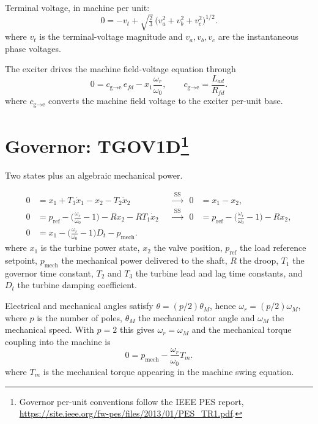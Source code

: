\documentclass[11pt]{article}
\newcommand{\wnom}{\omega_0}
\newcommand{\wrot}{\omega_r}
\begin{document}
Terminal voltage, in machine per unit:
\begin{equation}
  0 = -v_t + \sqrt{\tfrac{2}{3}}\,\Big(v_a^2+v_b^2+v_c^2\Big)^{1/2}.
\end{equation}
where $v_t$ is the terminal-voltage magnitude and $v_a,v_b,v_c$ are the
instantaneous phase voltages.

The exciter drives the machine field-voltage equation through
\begin{equation}
  0 = c_{\text{g}\to\text{e}}\,e_{fd} - x_1\frac{\wrot}{\wnom},
  \qquad c_{\text{g}\to\text{e}} = \frac{L_{ad}}{R_{fd}} .
\end{equation}
where $c_{\text{g}\to\text{e}}$ converts the machine field voltage to the
exciter per-unit base.

\section[Governor: TGOV1D]{Governor:
TGOV1D\protect\footnote{Governor per-unit conventions follow the IEEE PES
report, \url{https://site.ieee.org/fw-pes/files/2013/01/PES_TR1.pdf}.}}

Two states plus an algebraic mechanical power.

\begin{align}
  0 &= x_1 + T_3\dot{x}_1 - x_2 - T_2\dot{x}_2
     &&\xrightarrow{\;\text{SS}\;}& 0 &= x_1 - x_2, \\
  0 &= p_{\text{ref}} - \Big(\tfrac{\wrot}{\wnom}-1\Big) - R x_2 - R T_1 \dot{x}_2
     &&\xrightarrow{\;\text{SS}\;}& 0 &= p_{\text{ref}} - \Big(\tfrac{\wrot}{\wnom}-1\Big) - R x_2, \\
  0 &= x_1 - \Big(\tfrac{\wrot}{\wnom}-1\Big) D_t - p_{\text{mech}} .
\end{align}
where $x_1$ is the turbine power state, $x_2$ the valve position,
$p_{\text{ref}}$ the load reference setpoint, $p_{\text{mech}}$ the
mechanical power delivered to the shaft, $R$ the droop, $T_1$ the governor
time constant, $T_2$ and $T_3$ the turbine lead and lag time constants, and
$D_t$ the turbine damping coefficient.

Electrical and mechanical angles satisfy $\theta = (p/2)\theta_M$, hence
$\wrot = (p/2)\omega_M$, where $p$ is the number of poles, $\theta_M$ the
mechanical rotor angle and $\omega_M$ the mechanical speed. With $p=2$ this
gives $\wrot=\omega_M$ and the mechanical torque coupling into the machine
is
\begin{equation}
  0 = p_{\text{mech}} - \frac{\wrot}{\wnom}T_m .
\end{equation}
where $T_m$ is the mechanical torque appearing in the machine swing
equation.
\end{document}
